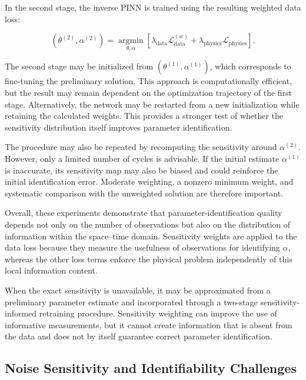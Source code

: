 In the second stage, the inverse PINN is trained using the resulting weighted data
loss:

\begin{equation}
\left(
\theta^{(2)},\alpha^{(2)}
\right)
=
\underset{\theta,\alpha}{\operatorname{argmin}}
\left[
\lambda_{\mathrm{data}}
\mathcal{L}_{\mathrm{data}}^{(w)}
+
\lambda_{\mathrm{physics}}
\mathcal{L}_{\mathrm{physics}}
\right].
\end{equation}

The second stage may be initialized from
$(\theta^{(1)},\alpha^{(1)})$, which corresponds to fine-tuning the preliminary
solution. This approach is computationally efficient, but the result may remain
dependent on the optimization trajectory of the first stage. Alternatively, the
network may be restarted from a new initialization while retaining the calculated
weights. This provides a stronger test of whether the sensitivity distribution
itself improves parameter identification.

The procedure may also be repeated by recomputing the sensitivity around
$\alpha^{(2)}$. However, only a limited number of cycles is advisable. If the
initial estimate $\alpha^{(1)}$ is inaccurate, its sensitivity map may also be
biased and could reinforce the initial identification error. Moderate weighting,
a nonzero minimum weight, and systematic comparison with the unweighted solution
are therefore important.

Overall, these experiments demonstrate that parameter-identification quality
depends not only on the number of observations but also on the distribution of
information within the space--time domain. Sensitivity weights are applied to the
data loss because they measure the usefulness of observations for identifying
$\alpha$, whereas the other loss terms enforce the physical problem independently
of this local information content.

When the exact sensitivity is unavailable, it may be approximated from a
preliminary parameter estimate and incorporated through a two-stage
sensitivity-informed retraining procedure. Sensitivity weighting can improve the
use of informative measurements, but it cannot create information that is absent
from the data and does not by itself guarantee correct parameter identification.

\subsection{Noise Sensitivity and Identifiability Challenges}
\label{subsec:noise_identifiability}

